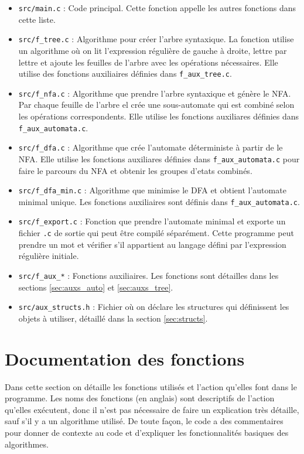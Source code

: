 \documentclass[12pt]{article}
\begin{document}
\begin{itemize}
  \item \texttt{src/main.c} : Code principal. Cette fonction appelle les autres fonctions dans cette liste.
  \item \texttt{src/f\_tree.c} : Algorithme pour créer l'arbre syntaxique. La fonction utilise un algorithme où on lit l'expression régulière de gauche à droite, lettre par lettre et ajoute les feuilles de l'arbre avec les opérations nécessaires. Elle utilise des fonctions auxiliaires définies dans \texttt{f\_aux\_tree.c}.
  \item \texttt{src/f\_nfa.c} : Algorithme que prendre l'arbre syntaxique et génère le NFA. Par chaque feuille de l'arbre el crée une sous-automate qui est combiné selon les opérations correspondents. Elle utilise les fonctions auxiliares définies dans \texttt{f\_aux\_automata.c}.
  \item \texttt{src/f\_dfa.c} : Algorithme que crée l'automate déterministe à partir de le NFA. Elle utilise les fonctions auxiliares définies dans \texttt{f\_aux\_automata.c} pour faire le parcours du NFA et obtenir les groupes d'etats combinés.
  \item \texttt{src/f\_dfa\_min.c} : Algorithme que minimise le DFA et obtient l'automate minimal unique. Les fonctions auxiliaires sont définis dans \texttt{f\_aux\_automata.c}.
  \item \texttt{src/f\_export.c} : Fonction que prendre l'automate minimal et exporte un fichier \texttt{.c} de sortie qui peut être compilé séparément. Cette programme peut prendre un mot et vérifier s'il appartient au langage défini par l'expression régulière initiale.
  \item \texttt{src/f\_aux\_*} : Fonctions auxiliaires. Les fonctions sont détailles dans les sections \ref{sec:auxs_auto} et \ref{sec:auxs_tree}.
  \item \texttt{src/aux\_structs.h} : Fichier où on déclare les structures qui définissent les objets à utiliser, détaillé dans la section \ref{sec:structs}.
\end{itemize}

\section{Documentation des fonctions}
Dans cette section on détaille les fonctions utilisés et l'action qu'elles font dans le programme. Les noms des fonctions (en anglais) sont descriptifs de l'action qu'elles exécutent, donc il n'est pas nécessaire de faire un explication très détaille, sauf s'il y a un algorithme utilisé. De toute façon, le code a des commentaires pour donner de contexte au code et d'expliquer les fonctionnalités basiques des algorithmes. 
\end{document}

